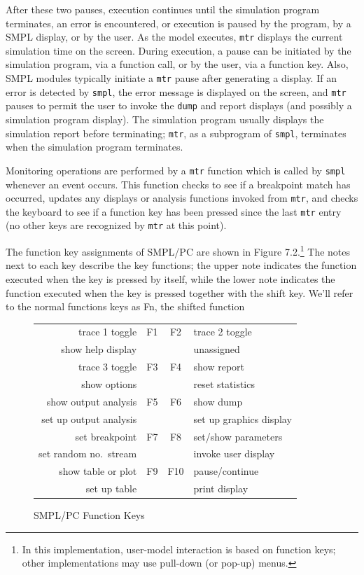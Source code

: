 After these two pauses, execution continues until the simulation program
terminates, an error is encountered, or execution is paused by the program, by
a SMPL display, or by the user. As the model executes, \texttt{mtr} displays the
current simulation time on the screen. During execution, a pause can be
initiated by the simulation program, via a function call, or by the user, via a
function key. Also, SMPL modules typically initiate a \texttt{mtr} pause after
generating a display. If an error is detected by \texttt{smpl}, the error message is
displayed on the screen, and \texttt{mtr} pauses to permit the user to invoke the
\texttt{dump} and report displays (and possibly a simulation program display). The
simulation program usually displays the simulation report before terminating;
\texttt{mtr}, as a subprogram of \texttt{smpl}, terminates when the simulation program
terminates.

Monitoring operations are performed by a \texttt{mtr} function which is called by
\texttt{smpl} whenever an event occurs. This function checks to see if a breakpoint
match has occurred, updates any displays or analysis functions invoked from
\texttt{mtr}, and checks the keyboard to see if a function key has been pressed since
the last \texttt{mtr} entry (no other keys are recognized by \texttt{mtr} at this point).

The function key assignments of SMPL/PC are shown in Figure 7.2.\footnote{In this implementation, user-model interaction is based on function keys; other implementations may use pull-down (or pop-up) menus.}
The notes next to each key describe the key functions; the upper note indicates
the function executed when the key is pressed by itself, while the lower note
indicates the function executed when the key is pressed together with the
shift key. We'll refer to the normal functions keys as Fn, the shifted function

\begin{figure}[H]
\centering
\begin{tabular}{r c c l}
trace 1 toggle & F1 & F2 & trace 2 toggle \\
show help display & & & unassigned \\
trace 3 toggle & F3 & F4 & show report \\
show options & & & reset statistics \\
show output analysis & F5 & F6 & show dump \\
set up output analysis & & & set up graphics display \\
set breakpoint & F7 & F8 & set/show parameters \\
set random no.\ stream & & & invoke user display \\
show table or plot & F9 & F10 & pause/continue \\
set up table & & & print display \\
\end{tabular}
\caption{SMPL/PC Function Keys}
\label{fig:smpl-function-keys}
\end{figure}

